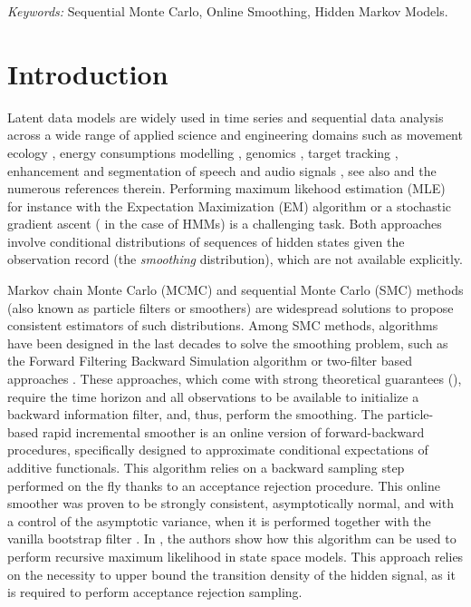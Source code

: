 \documentclass[12pt]{article}
\begin{document}
\noindent%
{\it Keywords:} Sequential Monte Carlo, Online Smoothing, Hidden Markov Models.
\vfill

\newpage
{} %


\section{Introduction}
\label{sec:intro}
Latent data models are widely used in time series and sequential data analysis across a wide range of applied science
and engineering domains such as movement ecology \citep{michelot2016movehmm}, energy consumptions modelling \citep{candanedo2017methodology}, genomics \citep{yau2011bayesian, gassiat2016inference, wang2017variational},  target tracking \citep{sarkka2007rao}, enhancement and segmentation of speech and audio signals \citep{rabiner1989tutorial}, see also \citep{sarkka2013bayesian, douc2014nonlinear, zucchini2017hidden} and the numerous references therein.  Performing maximum likehood estimation (MLE) for instance with the Expectation Maximization (EM) algorithm  \citep{dempster1977maximum} or a stochastic gradient ascent (\cite{cappe2005inference} in the case of HMMs) is a challenging task.  Both approaches involve conditional distributions of sequences of hidden states given the observation record (the \textit{smoothing} distribution), which are not available explicitly.  


Markov chain Monte Carlo (MCMC) and sequential Monte Carlo (SMC) methods (also known as particle filters or smoothers) are widespread solutions to propose consistent estimators of such distributions. 
Among SMC methods, algorithms have been designed in the last decades to solve the smoothing problem, such as the Forward Filtering Backward Simulation algorithm \citep{douc2011sequential}  or two-filter based approaches \citep{briers2010smoothing, fearnhead2010sequential, nguyen2017two}. %
These approaches, which come with strong theoretical guarantees (\cite{delmoral2010backward, douc2011sequential, dubarry2013nonasymptotic, gerber2017convergence}), require the time horizon and all observations to be available  to initialize a backward information filter, and, thus, perform the smoothing.
The particle-based rapid incremental smoother \citep{olsson2017efficient} is an online version of forward-backward procedures, specifically designed to approximate conditional expectations of additive functionals. 
This algorithm relies on a backward sampling step performed on the fly thanks to an acceptance rejection procedure. 
This online smoother was proven to be strongly consistent, asymptotically normal, and with a control of the asymptotic variance, when it is performed together with the vanilla bootstrap filter \citep{gordon1993novel}. 
In \cite{olsson2020particle}, the authors show how this algorithm can be used to perform recursive maximum likelihood in state space models. This approach relies on the necessity to upper bound the transition density of the hidden signal, as it is required to perform acceptance rejection sampling.
\end{document}
